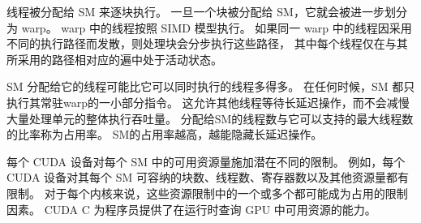 线程被分配给 SM 来逐块执行。 一旦一个块被分配给 SM，它就会被进一步划分为 warp。 
warp 中的线程按照 SIMD 模型执行。 如果同一 warp 中的线程因采用不同的执行路径而发散，则处理块会分步执行这些路径，
其中每个线程仅在与其所采用的路径相对应的遍中处于活动状态。

SM 分配给它的线程可能比它可以同时执行的线程多得多。 在任何时候，SM 都只执行其常驻warp的一小部分指令。 
这允许其他线程等待长延迟操作，而不会减慢大量处理单元的整体执行吞吐量。 
分配给SM的线程数与它可以支持的最大线程数的比率称为占用率。 SM的占用率越高，越能隐藏长延迟操作。

每个 CUDA 设备对每个 SM 中的可用资源量施加潜在不同的限制。 
例如，每个 CUDA 设备对其每个 SM 可容纳的块数、线程数、寄存器数以及其他资源量都有限制。 
对于每个内核来说，这些资源限制中的一个或多个都可能成为占用的限制因素。 
CUDA C 为程序员提供了在运行时查询 GPU 中可用资源的能力。